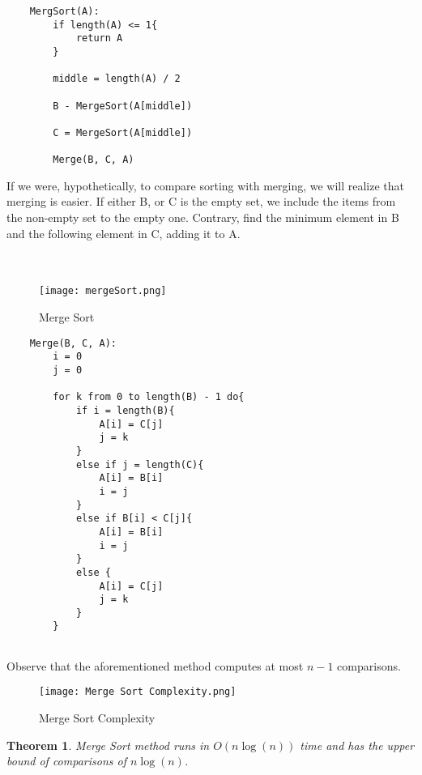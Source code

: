 \documentclass[11pt, letter paper]{article}
\newtheorem{theorem}{Theorem}
\begin{document}
    \begin{lstlisting}
    MergSort(A):
        if length(A) <= 1{
            return A
        }
        
        middle = length(A) / 2

        B - MergeSort(A[middle])

        C = MergeSort(A[middle])

        Merge(B, C, A)
    \end{lstlisting}

    If we were, hypothetically, to compare sorting with merging, we will realize that merging is easier. If either B, or C is the empty set, we include the items from the non-empty set to the empty one. Contrary, find the minimum element in B and the following element in C, adding it to A. \\ \\ \\

    \begin{figure}[t!]
        \centering
        \texttt{[image: mergeSort.png]}
        \caption{Merge Sort}
        \label{fig:my_label}
    \end{figure}

    \begin{lstlisting}
    Merge(B, C, A):
        i = 0
        j = 0

        for k from 0 to length(B) - 1 do{
            if i = length(B){
                A[i] = C[j]
                j = k
            }
            else if j = length(C){
                A[i] = B[i]
                i = j
            }
            else if B[i] < C[j]{
                A[i] = B[i]
                i = j
            }
            else {
                A[i] = C[j]
                j = k
            }
        }
        
    \end{lstlisting}

    Observe that the aforementioned method computes at most $n - 1$ comparisons.
    \begin{figure}[t]
        \centering
        \texttt{[image: Merge Sort Complexity.png]}
        \caption{Merge Sort Complexity}
        \label{fig:my_label}
        \cite{Morin}
    \end{figure}

    \begin{theorem}
       \cite{Morin} Merge Sort method runs in $O(n \log(n))$ time and has the upper bound of comparisons of $n \log(n)$.
    \end{theorem}
    
\end{document}
